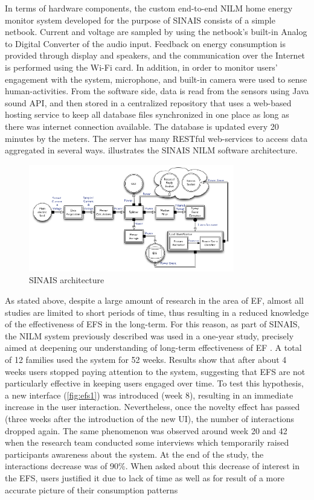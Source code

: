  In terms of hardware components, the custom end-to-end \ac{NILM} home energy monitor system developed for the purpose of \ac{SINAIS} consists of a simple netbook. Current and voltage are sampled by using the netbook’s built-in Analog to Digital Converter of the audio input. Feedback on energy consumption is provided through display and speakers, and the communication over the Internet is performed using the Wi-Fi card. In addition, in order to monitor users’ engagement with the system, microphone, and built-in camera were used to sense human-activities.  From the software side, data is read from the sensors using Java sound \ac{API}, and then stored in a centralized repository that uses a web-based hosting service to keep all database files synchronized in one place as long as there was internet connection available. The database is updated every 20 minutes by the meters. The server has many RESTful web-services to access data aggregated in several ways.   illustrates the SINAIS NILM software architecture.
 
 \begin{figure}[h]
\centering
\includegraphics[width=0.8\textwidth]{./Images/sinais}
\caption{\ac{SINAIS} architecture}
\label{fig:sinais}
\end{figure}


As stated above, despite a large amount of research in the area of \ac{EF}, almost all studies are limited to short periods of time, thus resulting in a reduced knowledge of the effectiveness of \ac{EFS} in the long-term. For this reason, as part of \ac{SINAIS}, the \ac{NILM} system previously described was used in a one-year study, precisely aimed at deepening our understanding of long-term effectiveness of \ac{EF} \cite{Pereira2013}. A total of 12 families used the system for 52 weeks. Results show that after about 4 weeks users stopped paying attention to the system, suggesting that \ac{EFS} are not particularly effective in keeping users engaged over time. To test this hypothesis, a new interface (\cref{fig:efs1}) was introduced (week 8), resulting in an immediate increase in the user interaction. Nevertheless, once the novelty effect has passed (three weeks after the introduction of the new \ac{UI}), the number of interactions dropped again. The same phenomenon was observed around week 20 and 42 when the research team conducted some interviews which temporarily raised participants awareness about the system.
At the end of the study, the interactions decrease was of 90\%. When asked about this decrease of interest in the \ac{EFS}, users justified it due to lack of time as well as for result of a more accurate picture of their consumption patterns


